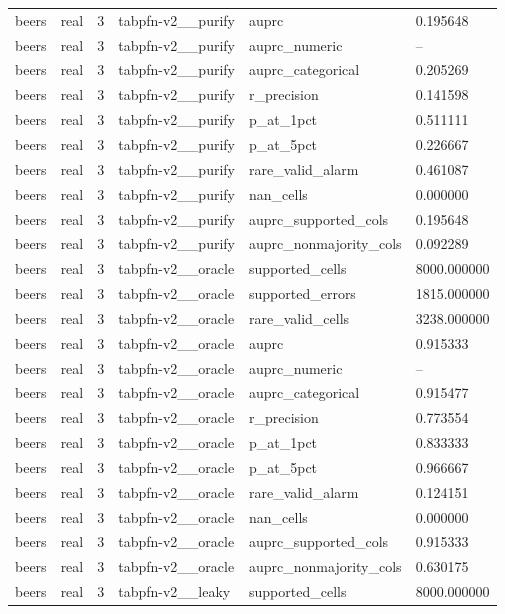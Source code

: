 \begin{tabular}{llllll}
beers & real & 3 & tabpfn-v2\_\_purify & auprc & 0.195648 \\
beers & real & 3 & tabpfn-v2\_\_purify & auprc\_numeric & -- \\
beers & real & 3 & tabpfn-v2\_\_purify & auprc\_categorical & 0.205269 \\
beers & real & 3 & tabpfn-v2\_\_purify & r\_precision & 0.141598 \\
beers & real & 3 & tabpfn-v2\_\_purify & p\_at\_1pct & 0.511111 \\
beers & real & 3 & tabpfn-v2\_\_purify & p\_at\_5pct & 0.226667 \\
beers & real & 3 & tabpfn-v2\_\_purify & rare\_valid\_alarm & 0.461087 \\
beers & real & 3 & tabpfn-v2\_\_purify & nan\_cells & 0.000000 \\
beers & real & 3 & tabpfn-v2\_\_purify & auprc\_supported\_cols & 0.195648 \\
beers & real & 3 & tabpfn-v2\_\_purify & auprc\_nonmajority\_cols & 0.092289 \\
beers & real & 3 & tabpfn-v2\_\_oracle & supported\_cells & 8000.000000 \\
beers & real & 3 & tabpfn-v2\_\_oracle & supported\_errors & 1815.000000 \\
beers & real & 3 & tabpfn-v2\_\_oracle & rare\_valid\_cells & 3238.000000 \\
beers & real & 3 & tabpfn-v2\_\_oracle & auprc & 0.915333 \\
beers & real & 3 & tabpfn-v2\_\_oracle & auprc\_numeric & -- \\
beers & real & 3 & tabpfn-v2\_\_oracle & auprc\_categorical & 0.915477 \\
beers & real & 3 & tabpfn-v2\_\_oracle & r\_precision & 0.773554 \\
beers & real & 3 & tabpfn-v2\_\_oracle & p\_at\_1pct & 0.833333 \\
beers & real & 3 & tabpfn-v2\_\_oracle & p\_at\_5pct & 0.966667 \\
beers & real & 3 & tabpfn-v2\_\_oracle & rare\_valid\_alarm & 0.124151 \\
beers & real & 3 & tabpfn-v2\_\_oracle & nan\_cells & 0.000000 \\
beers & real & 3 & tabpfn-v2\_\_oracle & auprc\_supported\_cols & 0.915333 \\
beers & real & 3 & tabpfn-v2\_\_oracle & auprc\_nonmajority\_cols & 0.630175 \\
beers & real & 3 & tabpfn-v2\_\_leaky & supported\_cells & 8000.000000 \\

\end{tabular}
